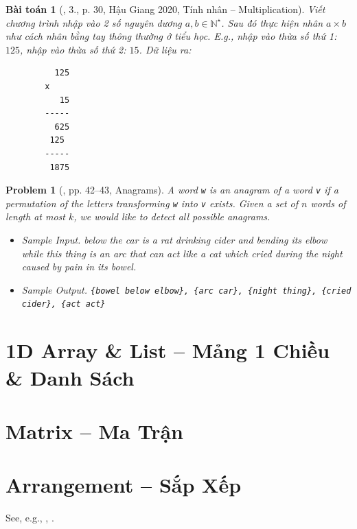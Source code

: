 \documentclass{article}
\newtheorem{baitoan}{Bài toán}
\newtheorem{problem}{Problem}
\begin{document}
\begin{baitoan}[\cite{VietSTEM2021}, 3., p. 30, Hậu Giang 2020, Tính nhân -- Multiplication]
	Viết chương trình nhập vào 2 số nguyên dương $a,b\in\mathbb{N}^\star$. Sau đó thực hiện nhân $a\times b$ như cách nhân bằng tay thông thường ở tiểu học. E.g., nhập vào thừa số thứ 1: $125$, nhập vào thừa số thứ 2: $15$. {\sf Dữ liệu ra:}
	\begin{verbatim}
		  125
		x
		   15
		-----
		  625
		 125
		-----
		 1875
	\end{verbatim}
\end{baitoan}

\begin{problem}[\cite{Durr_Vie2021}, pp. 42--43, Anagrams]
	A word {\tt w} is an \emph{anagram} of a word {\tt v} if a permutation of the letters transforming {\tt w} into {\tt v} exists. Given a set of $n$ words of length at most $k$, we would like to detect all possible anagrams.
	\begin{itemize}
		\item {\sf Sample Input.} below the car is a rat drinking cider and bending its elbow while this thing is an arc that can act like a cat which cried during the night caused by pain in its bowel.
		\item {\sf Sample Output.} \verb|{bowel below elbow}, {arc car}, {night thing}, {cried cider}, {act act}|
	\end{itemize}
\end{problem}


\section{1D Array \& List -- Mảng 1 Chiều \& Danh Sách}


\section{Matrix -- Ma Trận}


\section{Arrangement -- Sắp Xếp}
See, e.g., \cite[Chap. 5: Sorting]{Knuth1998}, \cite[Chap. II, Sect. Dạng bài sắp xếp]{VietSTEM2021}.
\end{document}
